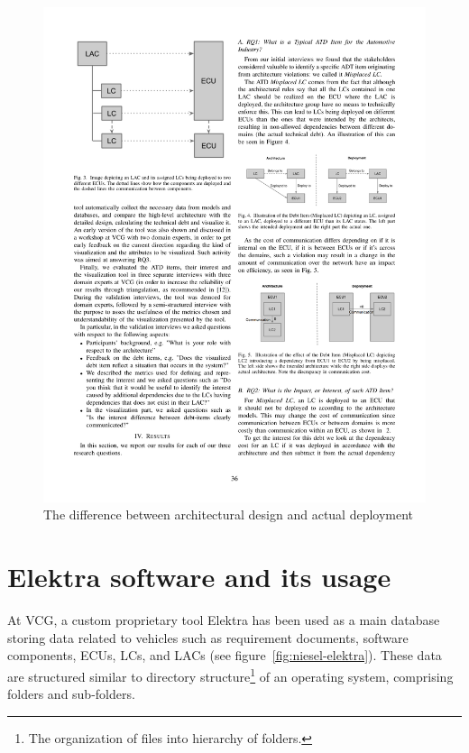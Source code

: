 \begin{figure}[H]
\centering
\captionsetup{justification=centering}
\vspace{0cm}%
\includegraphics[width=0.7\linewidth]{figure/literatures/eliasson_atd.pdf}
\caption{The difference between architectural design and actual deployment \cite{Eliasson_2}}
\label{fig:eliasson_atd}
\end{figure}


\section{Elektra software and its usage}
At VCG, a custom proprietary tool Elektra has been used as a main database storing data related to vehicles such as requirement documents, software components, ECUs, LCs, and LACs (see figure~\ref{fig:niesel-elektra}). These data are structured similar to directory structure\footnote{The organization of files into hierarchy of folders.} of an operating system, comprising folders and sub-folders.

